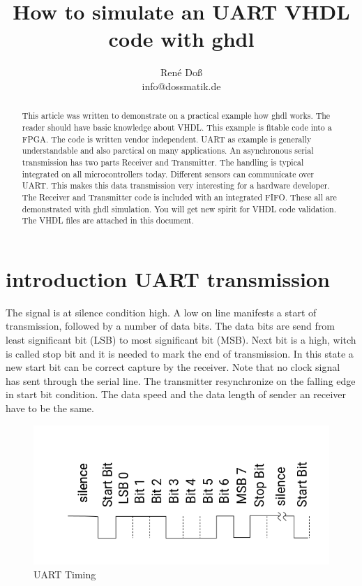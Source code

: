 \documentclass[a4paper,11pt]{article}
\title{How to simulate an UART VHDL code with ghdl}
\author{René Doß \\ info@dossmatik.de}
\begin{document}
\maketitle
\tableofcontents

\begin{abstract}
This article was written to demonstrate on a practical example how ghdl works. The reader should have basic knowledge about VHDL. This example is fitable code into a FPGA. The code is written vendor independent. UART as example is generally understandable and also parctical on many applications.
An asynchronous serial transmission has two parts Receiver and Transmitter. The handling is typical integrated on all microcontrollers today. Different sensors can communicate over UART. This makes this data transmission very interesting for a hardware developer. The Receiver and Transmitter code is included with an integrated FIFO. These all are demonstrated with ghdl simulation. You will get new spirit for VHDL code validation. The VHDL files are attached in this document.
\end{abstract}

\newpage
\section{introduction UART transmission}
The signal is at silence condition high. A low on line manifests a start of transmission, followed by a number of data bits. The data bits are send from least significant bit (LSB) to most significant bit (MSB). Next bit is a high, witch is called stop bit and it is needed to mark the end of transmission. In this state a new start bit can be correct capture by the receiver. Note that no clock signal has sent through the serial line. The transmitter resynchronize on the falling edge in start bit condition. The data speed and the data length of sender an receiver have to be the same.
\begin{figure}[H]
  \begin{center}
    \includegraphics[scale=0.5]{UART_timing.png}
    \caption{UART Timing}
    \label{fig:UART Timing}
  \end{center}
\end{figure}
\end{document}
